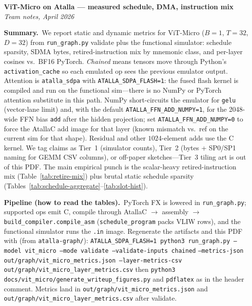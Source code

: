 \documentclass[10pt,letterpaper]{article}
\begin{document}
\RaggedRight

\noindent\textbf{ViT-Micro on Atalla — measured schedule, DMA, instruction mix}\\
\textit{Team notes, April 2026}
\medskip

\noindent\textbf{Summary.}\ 
We report static and dynamic metrics for ViT-Micro ($B{=}1$, $T{=}32$, $D{=}32$) from \texttt{run\_graph.py} validate plus the functional simulator: schedule sparsity, SDMA bytes, retired-instruction mix by mnemonic class, and per-layer cosines vs.\ BF16 PyTorch.
\textit{Chained} means tensors move through Python's \texttt{activation\_cache} so each emulated op sees the previous emulator output. Attention is \texttt{atalla\_sdpa} with \texttt{ATALLA\_SDPA\_FLASH=1}: the fused flash kernel is compiled and run on the functional sim---there is no NumPy or PyTorch attention substitute in this path. NumPy short-circuits the emulator for \texttt{gelu} (vector-lane limit) and, with the default \texttt{ATALLA\_FFN\_ADD\_NUMPY=1}, for the 2048-wide FFN bias \texttt{add} after the hidden projection; set \texttt{ATALLA\_FFN\_ADD\_NUMPY=0} to force the AtallaC add image for that layer (known mismatch vs.\ ref on the current sim for that shape). Residual and other $1024$-element adds use the C kernel.
We tag claims as Tier~1 (simulator counts), Tier~2 (bytes + SP0/SP1 naming for GEMM CSV columns), or off-paper sketches---Tier~3 tiling art is out of this PDF.
The main empirical punch is the scalar-heavy retired-instruction mix (Table~\ref{tab:retire-mix}) plus brutal static schedule sparsity (Tables~\ref{tab:schedule-aggregate}--\ref{tab:slot-hist}).

\medskip
\noindent\textbf{Pipeline (how to read the tables).}\ 
PyTorch FX is lowered in \texttt{run\_graph.py}; supported ops emit C, compile through AtallaC $\rightarrow$ assembly $\rightarrow$ \texttt{build\_compiler.compile\_asm} (\texttt{schedule\_program} packs VLIW rows), and the functional simulator runs the \texttt{.in} image. Regenerate the artifacts and this PDF with (from \texttt{atalla-graph/}):
\texttt{ATALLA\_SDPA\_FLASH=1 python3 run\_graph.py --model vit\_micro --mode validate --validate-inputs chained}
\texttt{--metrics-json out/graph/vit\_micro\_metrics.json --layer-metrics-csv out/graph/vit\_micro\_layer\_metrics.csv}
then \texttt{python3 docs/vit\_micro/generate\_writeup\_figures.py} and \texttt{pdflatex} as in the header comment.
Metrics land in \texttt{out/graph/vit\_micro\_metrics.json} and \texttt{out/graph/vit\_micro\_layer\_metrics.csv} after validate.
\end{document}
